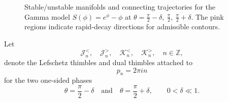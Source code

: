 \documentclass[11pt]{amsart}
\theoremstyle{plain}
\newcommand{\Z}{\mathbb Z}
\newcommand{\J}{\mathcal J}
\newcommand{\Kk}{\mathcal K}
\begin{document}
\begin{figure}[H]
\vspace{0.6em}

\begin{center}
\end{center}

\caption{
Stable/unstable manifolds and connecting trajectories for the Gamma model
\(
S(\phi)=e^\phi-\phi
\)
at
\(
\theta=\frac{\pi}{2}-\delta,\ \frac{\pi}{2},\ \frac{\pi}{2}+\delta
\).
The pink regions indicate rapid-decay directions for admissible contours. }
\label{fig:gamma-thimbles-three-phases}
\end{figure}

Let
\[
\J_n^{<},\quad \J_n^{>},
\quad
\Kk_n^{<},\quad \Kk_n^{>},
\quad n\in\Z,
\]
denote the Lefschetz thimbles and dual thimbles attached to
\[
p_n=2\pi i n
\]
for the two one-sided phases
\[
\theta=\frac{\pi}{2}-\delta
\quad\text{and}\quad
\theta=\frac{\pi}{2}+\delta,
\qquad 0<\delta\ll1.
\]
\end{document}
